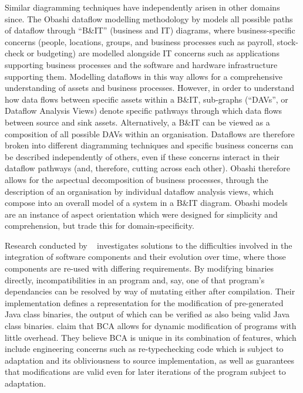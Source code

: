 Similar diagramming techniques have independently arisen in other domains since.
The Obashi dataflow modelling methodology\cite{obashimethodology} by
\citeauthor{obashimethodology} models all possible paths of dataflow through
``B\&IT'' (business and IT) diagrams, where business-specific concerns (people,
locations, groups, and business processes such as payroll, stock-check or
budgeting) are modelled alongside IT concerns such as applications supporting
business processes and the software and hardware infrastructure supporting them.
Modelling dataflows in this way allows for a comprehensive understanding of
assets and business processes. However, in order to understand how data flows
between specific assets within a B\&IT, sub-graphs (``DAVs'', or Dataflow
Analysis Views) denote specific pathways through which data flows between source
and sink assets. Alternatively, a B\&IT can be viewed as a composition of all
possible DAVs within an organisation. Dataflows are therefore broken into
different diagramming techniques and specific business concerns can be described
independently of others, even if these concerns interact in their dataflow
pathways (and, therefore, cutting across each other). Obashi therefore allows
for the aspectual decomposition of business processes, through the description
of an organisation by individual dataflow analysis views, which compose into an
overall model of a system in a B\&IT diagram. Obashi models are an instance of
aspect orientation which were designed for simplicity and
comprehension\cite{obashimethodology,seow2011obashi}, but trade this for
domain-specificity.

Research conducted by ~\cite{keller1998binary}
investigates solutions to the difficulties involved in the integration of
software components and their evolution over time, where those components are
re-used with differing requirements. By modifying binaries directly,
incompatibilities in an program and, say, one of that program's dependancies can
be resolved by way of mutating either after compilation. Their implementation
defines a representation for the modification of pre-generated Java class
binaries, the output of which can be verified as also being valid Java class
binaries.  claim that BCA allows for dynamic
modification of programs with little overhead. They believe BCA is unique in its
combination of features, which include engineering concerns such as
re-typechecking code which is subject to adaptation and its obliviousness to
source implementation, as well as guarantees that modifications are valid even
for later iterations of the program subject to adaptation.

